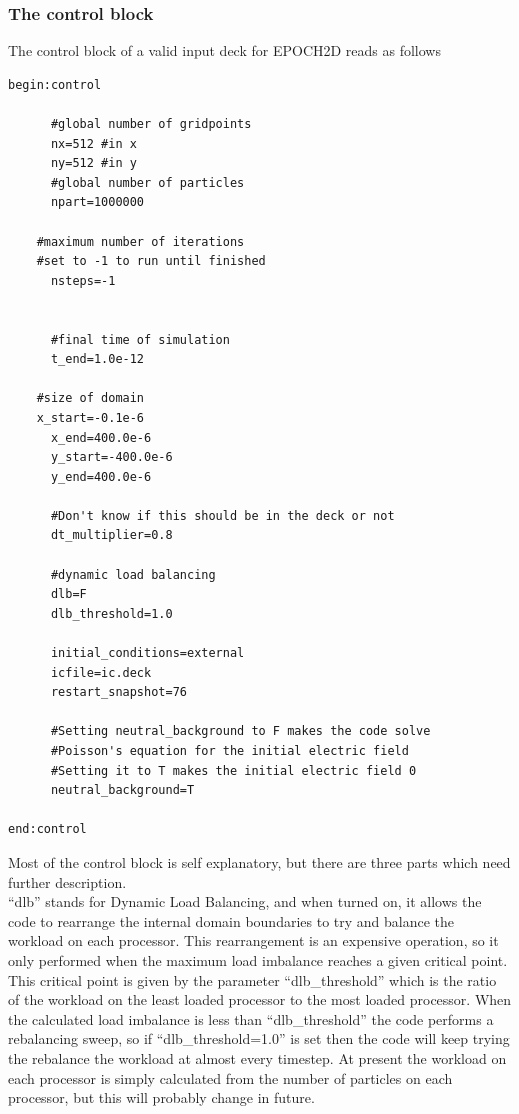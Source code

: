 \documentclass[12pt]{article}
\begin{document}
\subsubsection{The control block}
The control block of a valid input deck for EPOCH2D reads as follows\\
\begin{verbatim}
begin:control

      #global number of gridpoints
      nx=512 #in x
      ny=512 #in y
      #global number of particles
      npart=1000000

	#maximum number of iterations
	#set to -1 to run until finished
      nsteps=-1


      #final time of simulation
      t_end=1.0e-12

	#size of domain
	x_start=-0.1e-6
      x_end=400.0e-6
      y_start=-400.0e-6
      y_end=400.0e-6

      #Don't know if this should be in the deck or not
      dt_multiplier=0.8

      #dynamic load balancing
      dlb=F
      dlb_threshold=1.0

      initial_conditions=external
      icfile=ic.deck
      restart_snapshot=76

      #Setting neutral_background to F makes the code solve
      #Poisson's equation for the initial electric field
      #Setting it to T makes the initial electric field 0
      neutral_background=T

end:control
\end{verbatim}
Most of the control block is self explanatory, but there are three parts which need further description. \\
``dlb'' stands for Dynamic Load Balancing, and when turned on, it allows the code to rearrange the internal domain boundaries to try and balance the workload on each processor. This rearrangement is an expensive operation, so it only performed when the maximum load imbalance reaches a given critical point. This critical point is given by the parameter ``dlb\_threshold'' which is the ratio of the workload on the least loaded processor to the most loaded processor. When the calculated load imbalance is less than ``dlb\_threshold'' the code performs a rebalancing sweep, so if ``dlb\_threshold=1.0'' is set then the code will keep trying the rebalance the workload at almost every timestep. At present the workload on each processor is simply calculated from the number of particles on each processor, but this will probably change in future.\\
\end{document}
